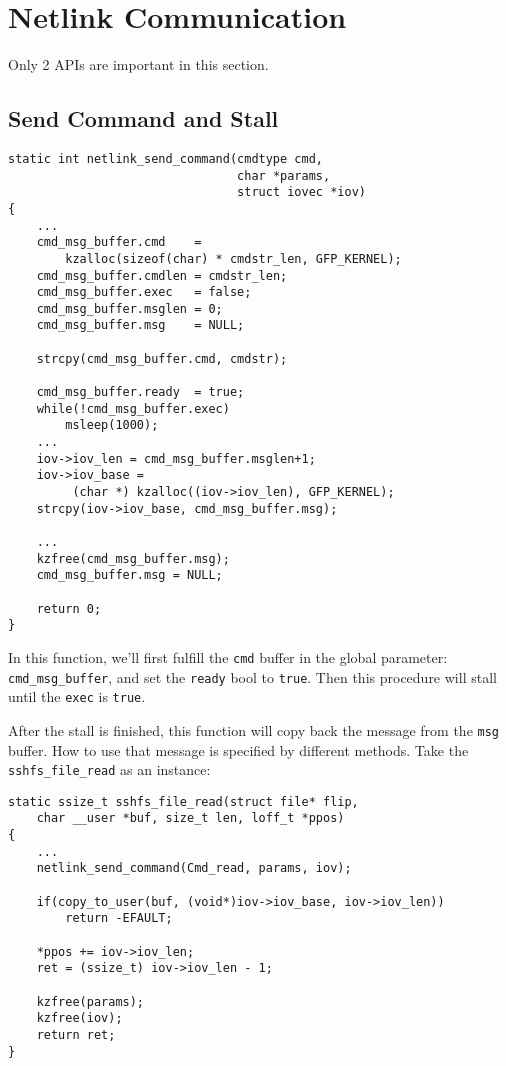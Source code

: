 \section{Netlink Communication}

Only 2 APIs are important in this section.

\subsection{Send Command and Stall}

\begin{lstlisting}
static int netlink_send_command(cmdtype cmd,
                                char *params,
                                struct iovec *iov)
{
	...
    cmd_msg_buffer.cmd    = 
		kzalloc(sizeof(char) * cmdstr_len, GFP_KERNEL);
    cmd_msg_buffer.cmdlen = cmdstr_len;
    cmd_msg_buffer.exec   = false;
    cmd_msg_buffer.msglen = 0;
    cmd_msg_buffer.msg    = NULL;

    strcpy(cmd_msg_buffer.cmd, cmdstr);

    cmd_msg_buffer.ready  = true;
    while(!cmd_msg_buffer.exec)
        msleep(1000);
	...
    iov->iov_len = cmd_msg_buffer.msglen+1;
    iov->iov_base =
         (char *) kzalloc((iov->iov_len), GFP_KERNEL);
    strcpy(iov->iov_base, cmd_msg_buffer.msg);
    
	...
    kzfree(cmd_msg_buffer.msg);
    cmd_msg_buffer.msg = NULL;

    return 0;
}
\end{lstlisting}

In this function, we'll first fulfill the \lstinline{cmd} buffer in the global parameter:\\ \lstinline{cmd_msg_buffer}, and set the \lstinline{ready} bool to \lstinline{true}. Then this procedure will stall until the \lstinline{exec} is \lstinline{true}.

After the stall is finished, this function will copy back the message from the \lstinline{msg} buffer. How to use that message is specified by different methods. Take the \lstinline{sshfs_file_read} as an instance:
\newpage
\begin{lstlisting}[title=\bfseries file read]
static ssize_t sshfs_file_read(struct file* flip, 
	char __user *buf, size_t len, loff_t *ppos)
{
 	...  
    netlink_send_command(Cmd_read, params, iov);
    
    if(copy_to_user(buf, (void*)iov->iov_base, iov->iov_len))
        return -EFAULT;

    *ppos += iov->iov_len;
    ret = (ssize_t) iov->iov_len - 1;

    kzfree(params);
    kzfree(iov);
    return ret;
}
\end{lstlisting}

